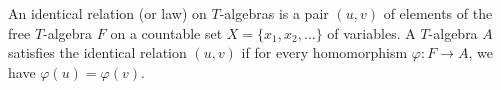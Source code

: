 An identical relation (or law) on $T$-algebras is a pair $(u, v)$ of elements of the free $T$-algebra $F$ on a countable set $X = \{x_1, x_2, \ldots\}$ of variables. A $T$-algebra $A$ satisfies the identical relation $(u, v)$ if for every homomorphism $\varphi: F \to A$, we have $\varphi(u) = \varphi(v)$.
